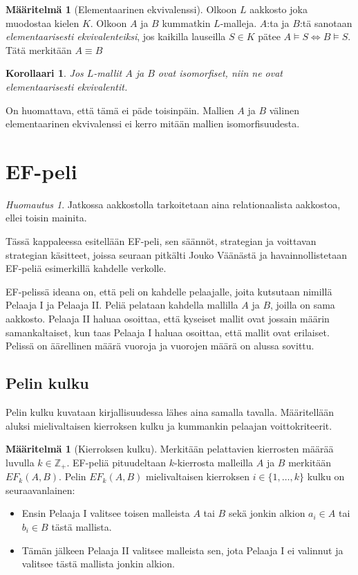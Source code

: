 \documentclass[finnish]{tktltiki2}
\newtheorem{kor}[lau]{Korollaari}
\theoremstyle{definition}
\newtheorem{maar}[lau]{Määritelmä}
\theoremstyle{remark}
\newtheorem*{huom}{Huomautus}
\begin{document}
\begin{maar}[Elementaarinen ekvivalenssi]
Olkoon $L$ aakkosto joka muodostaa kielen $K$. Olkoon $A$ ja $B$ kummatkin $L$-malleja. $A$:ta ja $B$:tä sanotaan \textit{elementaarisesti ekvivalenteiksi}, jos kaikilla lauseilla $S \in K$ pätee $A \vDash S \Longleftrightarrow B \models S$. Tätä merkitään $A \equiv B$
\end{maar}

\begin{kor}
Jos $L$-mallit $A$ ja $B$ ovat isomorfiset, niin ne ovat elementaarisesti ekvivalentit.
\end{kor}

On huomattava, että tämä ei päde toisinpäin. Mallien $A$ ja $B$ välinen elementaarinen ekvivalenssi ei kerro mitään mallien isomorfisuudesta. 

\section{EF-peli}
\begin{huom}
Jatkossa aakkostolla tarkoitetaan aina relationaalista aakkostoa, ellei toisin mainita.
\end{huom}

Tässä kappaleessa esitellään EF-peli, sen säännöt, strategian ja voittavan strategian käsitteet, joissa seuraan pitkälti Jouko Väänästä \cite{Vaa11} ja havainnollistetaan EF-peliä esimerkillä kahdelle verkolle.

EF-pelissä ideana on, että peli on kahdelle pelaajalle, joita kutsutaan nimillä Pelaaja I ja Pelaaja II. Peliä pelataan kahdella mallilla $A$ ja $B$, joilla on sama aakkosto. Pelaaja II haluaa osoittaa, että kyseiset mallit ovat jossain määrin samankaltaiset, kun taas Pelaaja I haluaa osoittaa, että mallit ovat erilaiset. Pelissä on äärellinen määrä vuoroja ja vuorojen määrä on alussa sovittu.

\subsection{Pelin kulku}
Pelin kulku kuvataan kirjallisuudessa lähes aina samalla tavalla. Määritellään aluksi mielivaltaisen kierroksen kulku ja kummankin pelaajan voittokriteerit.

\begin{maar}[Kierroksen kulku]
Merkitään pelattavien kierrosten määrää luvulla $k \in \mathbb{Z}_+$. EF-peliä pituudeltaan $k$-kierrosta malleilla $A$ ja $B$ merkitään $EF_k(A, B)$. Pelin $EF_k(A, B)$ mielivaltaisen kierroksen $i \in \{1, \ldots, k\}$ kulku on seuraavanlainen: 
\begin{itemize}
\item Ensin Pelaaja I valitsee toisen malleista $A$ tai $B$ sekä jonkin alkion $a_i \in A$ tai $b_i \in B$ tästä mallista.
\item Tämän jälkeen Pelaaja II valitsee malleista sen, jota Pelaaja I ei valinnut ja valitsee tästä mallista jonkin alkion.
\end{itemize}
\end{maar}
\end{document}
